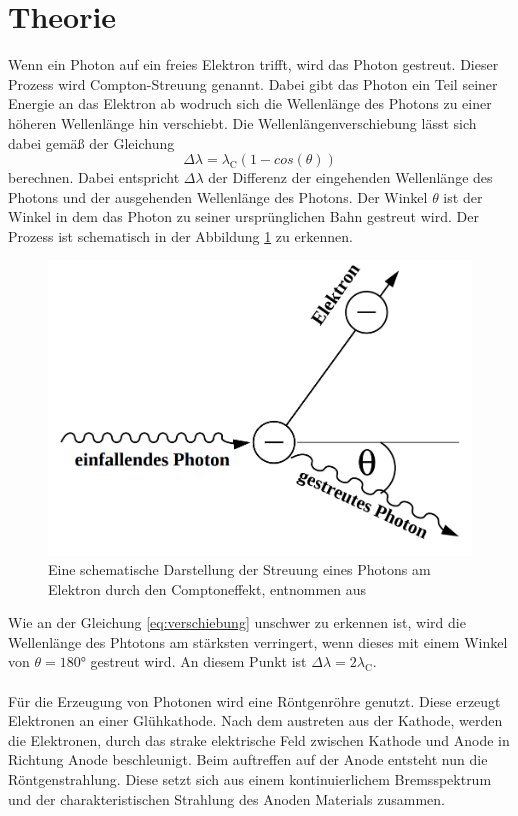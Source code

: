 \section{Theorie}
\label{sec:Theorie}

Wenn ein Photon auf ein freies Elektron trifft, wird das Photon gestreut.
Dieser Prozess wird Compton-Streuung genannt.
Dabei gibt das Photon ein Teil seiner Energie an das Elektron ab wodruch sich die Wellenlänge des Photons zu einer höheren Wellenlänge hin verschiebt.
Die Wellenlängenverschiebung lässt sich dabei gemäß der Gleichung 
\begin{equation}
    \Delta \lambda = \lambda _\text{C}(1-cos(\theta))
    \label{eq:verschiebung}
\end{equation}
berechnen.
Dabei entspricht $\Delta \lambda$ der Differenz der eingehenden Wellenlänge des Photons und der ausgehenden Wellenlänge des Photons.
Der Winkel $\theta$ ist der Winkel in dem das Photon zu seiner ursprünglichen Bahn gestreut wird.
Der Prozess ist schematisch in der Abbildung \ref{fig:streuung} zu erkennen.
\begin{figure}
    \centering
    \includegraphics[width=\textwidth/2]{content/data/streuung.png}
    \caption{Eine schematische Darstellung der Streuung eines Photons am Elektron durch den Comptoneffekt, entnommen aus \cite{anleitung}}
    \label{fig:streuung}
\end{figure}
Wie an der Gleichung \eqref{eq:verschiebung} unschwer zu erkennen ist, wird die Wellenlänge des Phtotons am stärksten verringert, wenn dieses mit einem Winkel von $\theta = 180 \si{\degree}$ gestreut wird.
An diesem Punkt ist $\Delta \lambda = 2 \lambda _\text{C}$.
\\\\
Für die Erzeugung von Photonen wird eine Röntgenröhre genutzt.
Diese erzeugt Elektronen an einer Glühkathode.
Nach dem austreten aus der Kathode, werden die Elektronen, durch das strake elektrische Feld zwischen Kathode und Anode in Richtung Anode beschleunigt.
Beim auftreffen auf der Anode entsteht nun die Röntgenstrahlung.
Diese setzt sich aus einem kontinuierlichem Bremsspektrum und der charakteristischen Strahlung des Anoden Materials zusammen.


